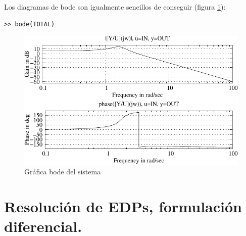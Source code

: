 Los diagramas de bode son igualmente sencillos de conseguir (figura
\ref{cap:bode}): 
\begin{verbatim}
>> bode(TOTAL)
\end{verbatim}%
\begin{figure}
 \centering
    \includegraphics[width=12cm, keepaspectratio]{figuras/bode}

\caption{\label{cap:bode}Gráfica bode del sistema}
\end{figure}



\section{Resolución de EDPs, formulación diferencial.}
